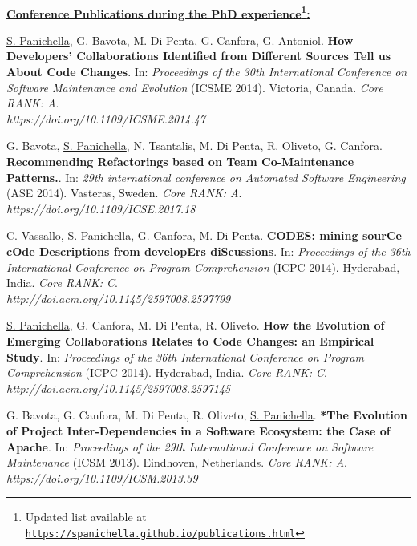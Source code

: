 \documentclass[10pt]{article}
\providecommand*\url[1]{\href{#1}{#1}}
\renewcommand*\url[1]{\href{#1}{\texttt{#1}}}
\begin{document}
\textbf{\\\underline{Conference Publications during the PhD experience\footnote{Updated list available at \url{https://spanichella.github.io/publications.html}}:}}\\
\begin{bibenum}
    \item  \label{C17}  \underline{S. Panichella}, G. Bavota, M. Di Penta, G. Canfora, G. Antoniol. \textbf{How Developers' Collaborations Identified from Different Sources Tell us About Code Changes}. In: \emph{Proceedings of the 30th International Conference on Software Maintenance and Evolution} (ICSME 2014). Victoria, Canada.  \textit{Core RANK: A}. \\\textit{https://doi.org/10.1109/ICSME.2014.47}

    \item  \label{C18}  G. Bavota, \underline{S. Panichella}, N. Tsantalis, M. Di Penta, R. Oliveto, G. Canfora. \textbf{Recommending Refactorings based on Team Co-Maintenance Patterns.}. In: \emph{29th international conference on Automated Software Engineering} (ASE 2014). Vasteras, Sweden.  \textit{Core RANK: A}.
    \\\textit{https://doi.org/10.1109/ICSE.2017.18}

    \item  \label{C19}  C. Vassallo, \underline{S. Panichella}, G. Canfora, M. Di Penta. \textbf{CODES: mining sourCe cOde Descriptions from developErs diScussions}. In: \emph{Proceedings of the 36th International Conference on Program Comprehension} (ICPC 2014). Hyderabad, India.  \textit{Core RANK: C}. \\\textit{http://doi.acm.org/10.1145/2597008.2597799}

    \item  \label{C20}  \underline{S. Panichella}, G. Canfora, M. Di Penta, R. Oliveto. \textbf{How the Evolution of Emerging Collaborations Relates to Code Changes: an Empirical Study}. In: \emph{Proceedings of the 36th International Conference on Program Comprehension} (ICPC 2014). Hyderabad, India.  \textit{Core RANK: C}.
    \\\textit{http://doi.acm.org/10.1145/2597008.2597145}

    \item  \label{C21}  G. Bavota, G. Canfora, M. Di Penta, R. Oliveto, \underline{S. Panichella}. \textbf{*The Evolution of Project Inter-Dependencies in a Software Ecosystem: the Case of Apache}. In: \emph{Proceedings of the 29th International Conference on Software Maintenance} (ICSM 2013). Eindhoven, Netherlands.  \textit{Core RANK: A}.
\\\textit{https://doi.org/10.1109/ICSM.2013.39}


\end{bibenum}
\end{document}
